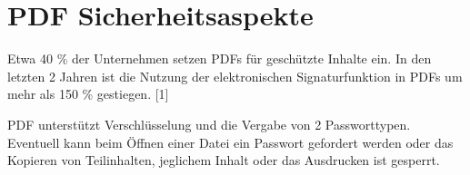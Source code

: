 \section{PDF Sicherheitsaspekte}
Etwa 40 \% der Unternehmen setzen PDFs für geschützte Inhalte ein. In den letzten 2 Jahren ist die Nutzung der elektronischen Signaturfunktion in PDFs um mehr als 150 \% gestiegen. [1]
\par
PDF unterstützt Verschlüsselung und die Vergabe von 2 Passworttypen. Eventuell kann beim Öffnen einer Datei ein Passwort gefordert werden oder das Kopieren von Teilinhalten, jeglichem Inhalt oder das Ausdrucken ist gesperrt.